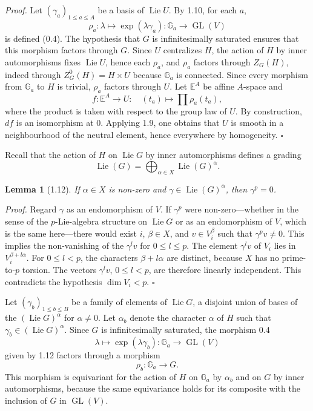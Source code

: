 \documentclass[10pt]{article}
\newcommand{\Ga}{\mathbb G_a}
\newcommand{\GL}{\operatorname{GL}}
\newcommand{\Lie}{\operatorname{Lie}}
\theoremstyle{deligne}
\newtheorem*{lemma*}{Lemma}
\newenvironment{proofdel}{\textit{Proof.}}{\hfill$\square$}
\newcommand{\heading}[1]{\vspace{0.7em}\noindent{\bfseries #1}\quad}
\begin{document}
\begin{proofdel}
Let \((\gamma_a)_{1\le a\le A}\) be a basis of \(\Lie U\). By 1.10, for each \(a\),
\[
  \rho_a:\lambda\longmapsto \exp(\lambda\gamma_a):\Ga\longrightarrow\GL(V)
\]
is defined (0.4). The hypothesis that \(G\) is infinitesimally saturated ensures that this morphism factors through \(G\). Since \(U\) centralizes \(H\), the action of \(H\) by inner automorphisms fixes \(\Lie U\), hence each \(\rho_a\), and \(\rho_a\) factors through \(Z_G(H)\), indeed through \(Z^0_G(H)=H\times U\) because \(\Ga\) is connected. Since every morphism from \(\Ga\) to \(H\) is trivial, \(\rho_a\) factors through \(U\). Let \(\mathbb E^A\) be affine \(A\)-space and
\[
  f:\mathbb E^A\longrightarrow U:\quad (t_a)\longmapsto \prod \rho_a(t_a),
\]
where the product is taken with respect to the group law of \(U\). By construction, \(df\) is an isomorphism at \(0\). Applying 1.9, one obtains that \(U\) is smooth in a neighbourhood of the neutral element, hence everywhere by homogeneity.
\end{proofdel}

Recall that the action of \(H\) on \(\Lie G\) by inner automorphisms defines a grading
\[
  \Lie(G)=\bigoplus_{\alpha\in X}\Lie(G)^\alpha .
\]

\begin{lemma*}[1.12]
If \(\alpha\in X\) is non-zero and \(\gamma\in\Lie(G)^\alpha\), then \(\gamma^p=0\).
\end{lemma*}

\begin{proofdel}
Regard \(\gamma\) as an endomorphism of \(V\). If \(\gamma^p\) were non-zero---whether in the sense of the \(p\)-Lie-algebra structure on \(\Lie G\) or as an endomorphism of \(V\), which is the same here---there would exist \(i\), \(\beta\in X\), and \(v\in V_i^\beta\) such that \(\gamma^pv\ne0\). This implies the non-vanishing of the \(\gamma^lv\) for \(0\le l\le p\). The element \(\gamma^lv\) of \(V_i\) lies in \(V_i^{\beta+l\alpha}\). For \(0\le l<p\), the characters \(\beta+l\alpha\) are distinct, because \(X\) has no prime-to-\(p\) torsion. The vectors \(\gamma^lv\), \(0\le l<p\), are therefore linearly independent. This contradicts the hypothesis \(\dim V_i<p\).
\end{proofdel}

\heading{1.13.} Let \((\gamma_b)_{1\le b\le B}\) be a family of elements of \(\Lie G\), a disjoint union of bases of the \((\Lie G)^\alpha\) for \(\alpha\ne0\). Let \(\alpha_b\) denote the character \(\alpha\) of \(H\) such that \(\gamma_b\in(\Lie G)^\alpha\). Since \(G\) is infinitesimally saturated, the morphism 0.4
\[
  \lambda\longmapsto \exp(\lambda\gamma_b):\Ga\longrightarrow\GL(V)
\]
given by 1.12 factors through a morphism
\[
  \rho_b:\Ga\longrightarrow G.
\]
This morphism is equivariant for the action of \(H\) on \(\Ga\) by \(\alpha_b\) and on \(G\) by inner automorphisms, because the same equivariance holds for its composite with the inclusion of \(G\) in \(\GL(V)\).
\end{document}
